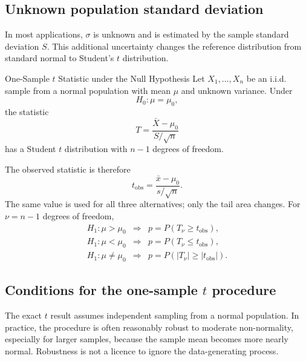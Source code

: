 \subsection{Unknown population standard deviation}

In most applications, $\sigma$ is unknown and is estimated by the sample standard deviation $S$. This additional uncertainty changes the reference distribution from standard normal to Student's $t$ distribution.

\newpage
\begin{theorem}{One-Sample $t$ Statistic under the Null Hypothesis}
Let $X_1,\ldots,X_n$ be an i.i.d. sample from a normal population with mean $\mu$ and unknown variance. Under
\[
H_0:\mu=\mu_0,
\]
the statistic
\[
T=\frac{\bar X-\mu_0}{S/\sqrt n}
\]
has a Student $t$ distribution with $n-1$ degrees of freedom.
\end{theorem}

The observed statistic is therefore
\[
t_{\mathrm{obs}}
=\frac{\bar x-\mu_0}{s/\sqrt n}.
\]
The same value is used for all three alternatives; only the tail area changes. For $\nu=n-1$ degrees of freedom,
\[
\begin{array}{lll}
H_1:\mu>\mu_0
&\Longrightarrow& p=P(T_\nu\geq t_{\mathrm{obs}}),\\[0.3em]
H_1:\mu<\mu_0
&\Longrightarrow& p=P(T_\nu\leq t_{\mathrm{obs}}),\\[0.3em]
H_1:\mu\neq\mu_0
&\Longrightarrow& p=P(|T_\nu|\geq|t_{\mathrm{obs}}|).
\end{array}
\]

\subsection{Conditions for the one-sample $t$ procedure}

The exact $t$ result assumes independent sampling from a normal population. In practice, the procedure is often reasonably robust to moderate non-normality, especially for larger samples, because the sample mean becomes more nearly normal. Robustness is not a licence to ignore the data-generating process.

